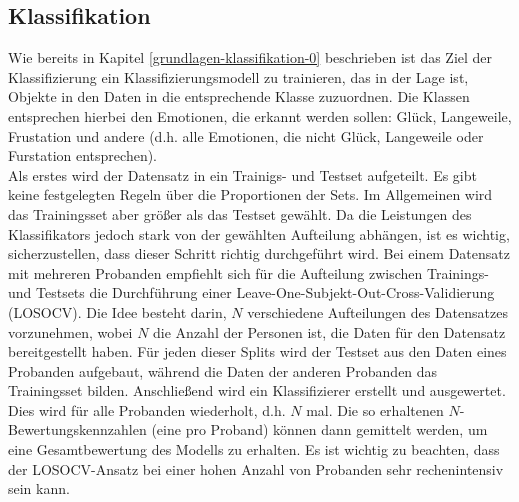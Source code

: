 \subsection{Klassifikation} \label{klassifikation-1}

Wie bereits in Kapitel \ref{grundlagen-klassifikation-0} beschrieben ist das Ziel der Klassifizierung ein Klassifizierungsmodell zu trainieren, das in der Lage ist, Objekte in den Daten in die entsprechende Klasse zuzuordnen. Die Klassen entsprechen hierbei den Emotionen, die erkannt werden sollen: Glück, Langeweile, Frustation und andere (d.h. alle Emotionen, die nicht Glück, Langeweile oder Furstation entsprechen). \\

Als erstes wird der Datensatz in ein Trainigs- und Testset  aufgeteilt. 
Es gibt keine festgelegten Regeln über die Proportionen der Sets. 
Im Allgemeinen wird das Trainingsset aber größer als das Testset gewählt.
Da die Leistungen des Klassifikators jedoch stark von der gewählten Aufteilung abhängen, ist es wichtig, sicherzustellen, dass dieser Schritt richtig durchgeführt wird.
Bei einem Datensatz mit mehreren Probanden empfiehlt sich für die Aufteilung zwischen Trainings- und Testsets die Durchführung einer Leave-One-Subjekt-Out-Cross-Validierung (LOSOCV).
Die Idee besteht darin, $N$ verschiedene Aufteilungen des Datensatzes vorzunehmen, wobei $N$ die Anzahl der Personen ist, die Daten für den Datensatz bereitgestellt haben. 
Für jeden dieser Splits wird der Testset aus den Daten eines Probanden aufgebaut, während die Daten der anderen Probanden das Trainingsset bilden. 
Anschließend wird ein Klassifizierer erstellt und ausgewertet. Dies wird für alle Probanden wiederholt, d.h. $N$ mal.
Die so erhaltenen $N$-Bewertungskennzahlen (eine pro Proband) können dann gemittelt werden, um eine Gesamtbewertung des Modells zu erhalten.
Es ist wichtig zu beachten, dass der LOSOCV-Ansatz bei einer hohen Anzahl von Probanden sehr rechenintensiv sein kann. \\

\begin{figure}[h] 
\label{fig:losocv} \end{figure} \vspace{0.5cm}